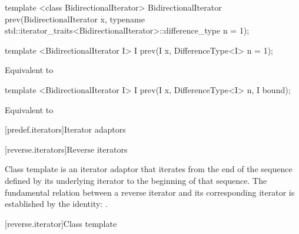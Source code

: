%
\begin{removedblock}
\begin{itemdecl}
template <class BidirectionalIterator>
  BidirectionalIterator prev(BidirectionalIterator x,
    typename std::iterator_traits<BidirectionalIterator>::difference_type n = 1);
\end{itemdecl}
\end{removedblock}
\begin{addedblock}
\begin{itemdecl}
template <BidirectionalIterator I>
  I prev(I x, DifferenceType<I> n = 1);
\end{itemdecl}
\end{addedblock}

\begin{itemdescr}
\pnum
\effects Equivalent to 
\end{itemdescr}

\begin{addedblock}
\begin{itemdecl}
template <BidirectionalIterator I>
  I prev(I x, DifferenceType<I> n, I bound);
\end{itemdecl}

\begin{itemdescr}
\pnum
\effects Equivalent to 
\end{itemdescr}
\end{addedblock}

[predef.iterators]{Iterator adaptors}

[reverse.iterators]{Reverse iterators}

\pnum
Class template  is an iterator adaptor that iterates from the end of the sequence defined by its underlying iterator to the beginning of that sequence.
The fundamental relation between a reverse iterator and its corresponding iterator
is established by the identity:
.

[reverse.iterator]{Class template }

